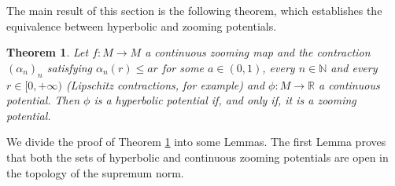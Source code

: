\documentclass[12pt,a4paper]{amsart}
\theoremstyle{plain}
\newtheorem{theorem}{Theorem}[subsection]
\begin{document}
The main result of this section is the following theorem, which establishes the equivalence between hyperbolic and zooming potentials.

\begin{theorem}\label{HYPERZOOM}
	Let $f:M \to M$  a continuous zooming map and  the contraction $(\alpha_{n})_{n}$ satisfying $\alpha_{n}(r) \leq ar$ for some $a \in (0,1)$, every $n \in \mathbb{N}$ and every $r \in [0,+\infty)$ (Lipschitz contractions, for example)  and $\phi : M \to \mathbb{R}$ a continuous potential. Then $\phi$ is a hyperbolic potential if, and only if, it is a zooming potential.
\end{theorem}

We divide the proof of Theorem \ref{HYPERZOOM} into some Lemmas. The first Lemma proves that both the sets of hyperbolic and continuous zooming potentials are open in the topology of the supremum norm.
\end{document}
